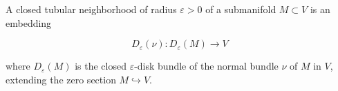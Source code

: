A closed tubular neighborhood of radius $\varepsilon > 0$ of a submanifold $M \subset V$ is an embedding

$$D_\varepsilon(\nu): D_\varepsilon(M) \to V$$

where $D_\varepsilon(M)$ is the closed $\varepsilon$-disk bundle of the normal bundle $\nu$ of $M$ in $V$, extending the zero section $M \hookrightarrow V$.
